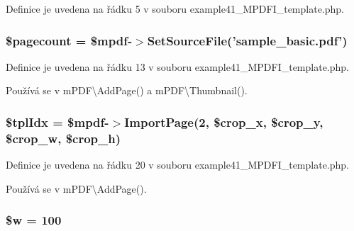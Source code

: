 Definice je uvedena na řádku 5 v souboru example41\-\_\-\-M\-P\-D\-F\-I\-\_\-template.\-php.

\hypertarget{example41___m_p_d_f_i__template_8php_a905390c82ddf2d57cc0c524f4e5b0425}{
\subsubsection[{\$pagecount}]{\setlength{\rightskip}{0pt plus 5cm}\$pagecount = \$mpdf-\/$>$Set\-Source\-File('sample\-\_\-basic.\-pdf')}}\label{example41___m_p_d_f_i__template_8php_a905390c82ddf2d57cc0c524f4e5b0425}


Definice je uvedena na řádku 13 v souboru example41\-\_\-\-M\-P\-D\-F\-I\-\_\-template.\-php.



Používá se v m\-P\-D\-F\textbackslash{}\-Add\-Page() a m\-P\-D\-F\textbackslash{}\-Thumbnail().

\hypertarget{example41___m_p_d_f_i__template_8php_a63a522b26f0a84495327fd182ea3e2b3}{
\subsubsection[{\$tpl\-Idx}]{\setlength{\rightskip}{0pt plus 5cm}\$tpl\-Idx = \$mpdf-\/$>$Import\-Page(2, \$crop\-\_\-x, \$crop\-\_\-y, \$crop\-\_\-w, \$crop\-\_\-h)}}\label{example41___m_p_d_f_i__template_8php_a63a522b26f0a84495327fd182ea3e2b3}


Definice je uvedena na řádku 20 v souboru example41\-\_\-\-M\-P\-D\-F\-I\-\_\-template.\-php.



Používá se v m\-P\-D\-F\textbackslash{}\-Add\-Page().

\hypertarget{example41___m_p_d_f_i__template_8php_ae51391055f5e898dc2625d155b016aaa}{
\subsubsection[{\$w}]{\setlength{\rightskip}{0pt plus 5cm}\$w = 100}}\label{example41___m_p_d_f_i__template_8php_ae51391055f5e898dc2625d155b016aaa}


